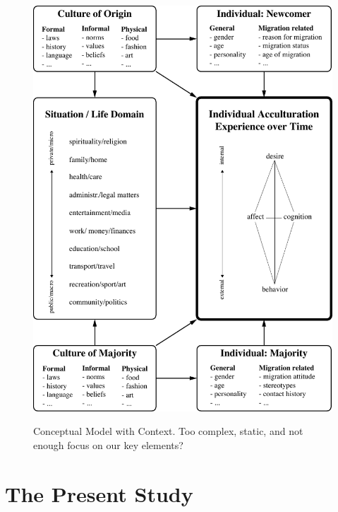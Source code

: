 \documentclass[man, 12pt, a4paper]{apa7}
\newcommand\Warning[1][2ex]{%
  \renewcommand\stacktype{L}%
  \scaleto{\stackon[1.3pt]{\color{red}$\triangle$}{\tiny\bfseries !}}{#1}}%
\begin{document}
\begin{figure}[h]
\centering
\caption{Conceptual Model with Context. Too complex, static, and not enough focus on our key elements?}
\includegraphics[width=\textwidth]{Figures/ConceptualFrameworkStatic.pdf}
\label{fig:ModelContext}
\end{figure}

\section{The Present Study}

\end{document}
